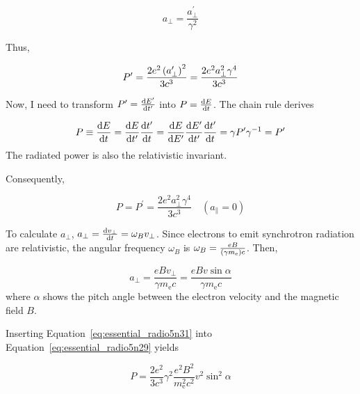 \begin{equation}\label{eq:essential_radio5n26}
    a_{\perp}=\frac{a_{\perp}^{\prime}}{\gamma^{2}}
\end{equation}

Thus,

\begin{equation}\label{eq:essential_radio5n27}
    P^{\prime}=\frac{2 e^{2}\left(a_{\perp}^{\prime}\right)^{2}}{3 c^{3}}=\frac{2 e^{2} a_{\perp}^{2} \gamma^{4}}{3 c^{3}}
\end{equation}

Now, I need to transform $P' = \frac{\mathrm{d} E'}{\mathrm{d} t'}$ into $P = \frac{\mathrm{d} E}{\mathrm{d} t}$.
The chain rule derives

\begin{equation}\label{eq:essential_radio5n28}
    P \equiv \frac{\mathrm{d} E}{\mathrm{d} t}=\frac{\mathrm{d} E}{\mathrm{d} t^{\prime}} \frac{\mathrm{d} t^{\prime}}{\mathrm{d} t}=\frac{\mathrm{d} E}{\mathrm{d} E^{\prime}} \frac{\mathrm{d} E^{\prime}}{\mathrm{d} t^{\prime}} \frac{\mathrm{d} t^{\prime}}{\mathrm{d} t}=\gamma P^{\prime} \gamma^{-1}=P^{\prime}
\end{equation}
The radiated power is also the relativistic invariant.

Consequently,

\begin{equation}\label{eq:essential_radio5n29}
    P=P^{\prime}=\frac{2 e^{2} a_{\perp}^{2} \gamma^{4}}{3 c^{3}} \quad\left(a_{\|}=0\right)
\end{equation}

To calculate $a_{\perp}$, $a_{\perp} = \frac{\mathrm{d} v_{\perp}}{\mathrm{d} t} = \omega_B v_{\perp}$.
Since electrons to emit synchrotron radiation are relativistic, the angular frequency $\omega_{B}$ is $\omega_B = \frac{eB}{\left(\gamma m_{\mathrm{e}}\right)c}$.
Then,

\begin{equation}\label{eq:essential_radio5n31}
    a_{\perp}=\frac{e B v_{\perp}}{\gamma m_{\mathrm{e}} c}=\frac{e B v \sin \alpha}{\gamma m_{\mathrm{e}} c}
\end{equation}
where $\alpha$ shows the pitch angle between the electron velocity and the magnetic field $B$.

Inserting Equation~\ref{eq:essential_radio5n31} into Equation~\ref{eq:essential_radio5n29} yields

\begin{equation}\label{eq:essential_radio5n32}
    P=\frac{2 e^{2}}{3 c^{3}} \gamma^{2} \frac{e^{2} B^{2}}{m_{\mathrm{e}}^{2} c^{2}} v^{2} \sin ^{2} \alpha
\end{equation}

